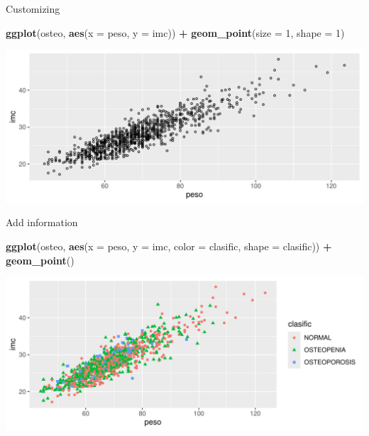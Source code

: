\documentclass[
  ignorenonframetext,
]{beamer}
\newenvironment{Shaded}{\begin{snugshade}}{\end{snugshade}}
\newcommand{\AttributeTok}[1]{\textcolor[rgb]{0.13,0.29,0.53}{#1}}
\newcommand{\DecValTok}[1]{\textcolor[rgb]{0.00,0.00,0.81}{#1}}
\newcommand{\FunctionTok}[1]{\textcolor[rgb]{0.13,0.29,0.53}{\textbf{#1}}}
\newcommand{\NormalTok}[1]{#1}
\newcommand{\SpecialCharTok}[1]{\textcolor[rgb]{0.81,0.36,0.00}{\textbf{#1}}}
\begin{document}
\begin{frame}[fragile]{Customizing}
\label{customizing-2}
\begin{Shaded}
\begin{Highlighting}[]
\FunctionTok{ggplot}\NormalTok{(osteo, }\FunctionTok{aes}\NormalTok{(}\AttributeTok{x =}\NormalTok{ peso, }\AttributeTok{y =}\NormalTok{ imc)) }\SpecialCharTok{+}
  \FunctionTok{geom\_point}\NormalTok{(}\AttributeTok{size =} \DecValTok{1}\NormalTok{, }\AttributeTok{shape =} \DecValTok{1}\NormalTok{)}
\end{Highlighting}
\end{Shaded}

\includegraphics{StatisticsWithR-3-Exploratory_Analysis_II_And_Graphics_files/figure-beamer/unnamed-chunk-16-1.pdf}
\end{frame}

\begin{frame}[fragile]{Add information}
\label{add-information}
\begin{Shaded}
\begin{Highlighting}[]
\FunctionTok{ggplot}\NormalTok{(osteo, }\FunctionTok{aes}\NormalTok{(}\AttributeTok{x =}\NormalTok{ peso, }\AttributeTok{y =}\NormalTok{ imc, }\AttributeTok{color =}\NormalTok{ clasific, }\AttributeTok{shape =}\NormalTok{ clasific)) }\SpecialCharTok{+}
  \FunctionTok{geom\_point}\NormalTok{()}
\end{Highlighting}
\end{Shaded}

\includegraphics{StatisticsWithR-3-Exploratory_Analysis_II_And_Graphics_files/figure-beamer/unnamed-chunk-17-1.pdf}
\end{frame}
\end{document}
